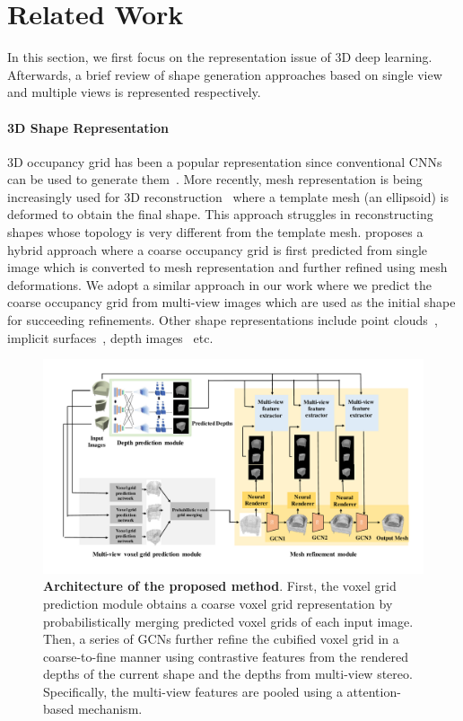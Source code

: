 \section{Related Work}
In this section, we first focus on the representation issue of 3D deep learning. Afterwards, a brief review of shape generation approaches based on single view and multiple views is represented respectively.  

\paragraph{3D Shape Representation}\vspace{-4mm}
3D occupancy grid has been a popular representation since conventional CNNs can be used to generate them~\cite{3dr2n2,kar2017lsm}.
More recently, mesh representation is being increasingly used for 3D reconstruction~\cite{wang2018pixel2mesh,wen2019pixel2mesh++} where a template mesh (an ellipsoid) is deformed to obtain the final shape.
This approach struggles in reconstructing shapes whose topology is very different from the template mesh.
\cite{gkioxari2019meshrcnn} proposes a hybrid approach where a coarse occupancy grid is first predicted from single image which is converted to mesh representation and further refined using mesh deformations.
We adopt a similar approach in our work where we predict the coarse occupancy grid from multi-view images which are used as the initial shape for succeeding refinements.
Other shape representations include point clouds~\cite{fan2017point,yang2018foldingnet,jia2020dv}, implicit surfaces~\cite{park2019deepsdf}, depth images~\cite{yao2018mvsnet,yao2019recurrent} etc.

\begin{figure}[t]
\begin{center}
\includegraphics[width=\linewidth]{imgs/meshrcnn_architecture.pdf}
\end{center}
\caption{
    \textbf{Architecture of the proposed method}.
    First, the voxel grid prediction module obtains a coarse voxel grid representation by probabilistically merging predicted voxel grids of each input image.
    Then, a series of GCNs further refine the cubified voxel grid in a coarse-to-fine manner using contrastive features from the rendered depths of the current shape and the depths from multi-view stereo.
    Specifically, the multi-view features are pooled using a attention-based mechanism.
}
\label{fig:system_architecture}
\end{figure}

